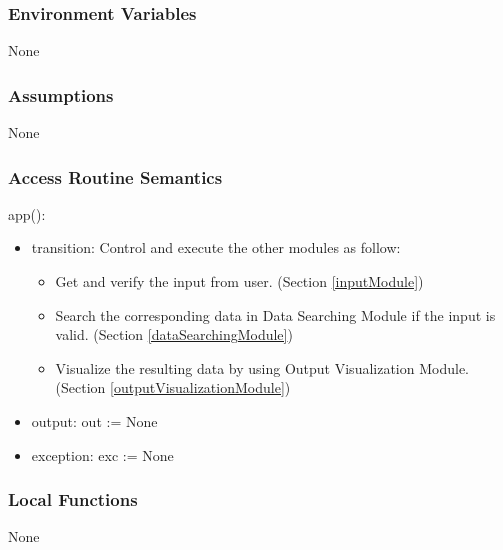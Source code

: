 \documentclass[12pt, titlepage]{article}
\begin{document}
\subsubsection{Environment Variables}

None


\subsubsection{Assumptions}

None

\subsubsection{Access Routine Semantics}

\noindent app():
\begin{itemize}
\item transition: Control and execute the other modules as follow:
\begin{itemize}
\item Get and verify the input from user. (Section \ref{inputModule}) 
\item Search the corresponding data in Data Searching Module if the input is valid. (Section \ref{dataSearchingModule})
\item Visualize the resulting data by using Output Visualization Module. (Section \ref{outputVisualizationModule})

\end{itemize}
\item output: out := None
\item exception: exc := None
\end{itemize}



\subsubsection{Local Functions}
None
  
\end{document}
